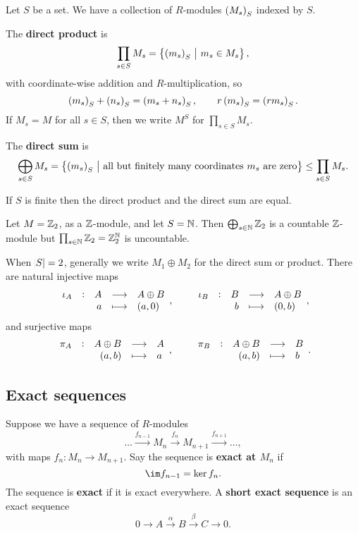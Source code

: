 Let $ S $ be a set. We have a collection of $ R $-modules $ \br{M_s}_S $ indexed by $ S $.

\begin{definition}
The \textbf{direct product} is
$$ \prod_{s \in S} M_s = \cbr{\br{m_s}_S \st m_s \in M_s}, $$
with coordinate-wise addition and $ R $-multiplication, so
$$ \br{m_s}_S + \br{n_s}_S = \br{m_s + n_s}_S, \qquad r\br{m_s}_S = \br{rm_s}_S. $$
If $ M_s = M $ for all $ s \in S $, then we write $ M^S $ for $ \prod_{s \in S} M_s $.
\end{definition}

\begin{definition}
The \textbf{direct sum} is
$$ \bigoplus_{s \in S} M_s = \cbr{\br{m_s}_S \st \text{all but finitely many coordinates} \ m_s \ \text{are zero}} \le \prod_{s \in S} M_s. $$
\end{definition}

If $ S $ is finite then the direct product and the direct sum are equal.

\begin{example*}
Let $ M = \mathbb{Z}_2 $, as a $ \mathbb{Z} $-module, and let $ S = \mathbb{N} $. Then $ \bigoplus_{s \in \mathbb{N}} \mathbb{Z}_2 $ is a countable $ \mathbb{Z} $-module but $ \prod_{s \in \mathbb{N}} \mathbb{Z}_2 = \mathbb{Z}_2^{\mathbb{N}} $ is uncountable.
\end{example*}

When $ \abs{S} = 2 $, generally we write $ M_1 \oplus M_2 $ for the direct sum or product. There are natural injective maps
$$ \function[\iota_A]{A}{A \oplus B}{a}{\br{a, 0}}, \qquad \function[\iota_B]{B}{A \oplus B}{b}{\br{0, b}}, $$
and surjective maps
$$ \function[\pi_A]{A \oplus B}{A}{\br{a, b}}{a}, \qquad \function[\pi_B]{A \oplus B}{B}{\br{a, b}}{b}. $$

\subsection{Exact sequences}

\begin{definition}
Suppose we have a sequence of $ R $-modules
$$ \dots \xrightarrow{f_{n - 1}} M_n \xrightarrow{f_n} M_{n + 1} \xrightarrow{f_{n + 1}} \dots, $$
with maps $ f_n : M_n \to M_{n + 1} $. Say the sequence is \textbf{exact at $ M_n $} if
$$ \im f_{n - 1} = \ker f_n. $$
The sequence is \textbf{exact} if it is exact everywhere. A \textbf{short exact sequence} is an exact sequence
$$ 0 \to A \xrightarrow{\alpha} B \xrightarrow{\beta} C \to 0. $$
\end{definition}

